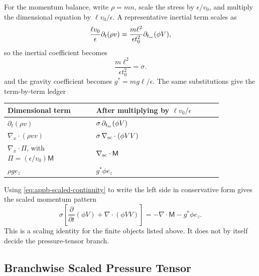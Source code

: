 For the momentum balance, write \(\rho=mn\), scale the stress by
\(\epsilon/v_0\), and multiply the dimensional equation by
\(\ell v_0/\epsilon\).  A representative inertial term scales as
\[
  \frac{\ell v_0}{\epsilon}\partial_t(\rho v)
  =
  \frac{m\ell^2}{\epsilon t_0^2}\partial_{t_{\rm sc}}(\phi V),
\]
so the inertial coefficient becomes
\[
  \frac{m\ell^2}{\epsilon t_0^2}=\sigma.
\]
and the gravity coefficient becomes \(g^*=mg\ell/\epsilon\).  The same
substitutions give the term-by-term ledger
\begin{center}
\begin{tabular}{@{}p{0.35\linewidth}p{0.50\linewidth}@{}}
\toprule
Dimensional term & After multiplying by \(\ell v_0/\epsilon\) \\
\midrule
\(\partial_t(\rho v)\) &
\(\sigma\,\partial_{t_{\rm sc}}(\phi V)\) \\
\(\nabla_x\cdot(\rho vv)\) &
\(\sigma\,\nabla_{\rm sc}\cdot(\phi VV)\) \\
\(\nabla_x\cdot\Pi\), with \(\Pi=(\epsilon/v_0)\mathsf{M}\) &
\(\nabla_{\rm sc}\cdot\mathsf{M}\) \\
\(\rho g e_z\) &
\(g^*\phi e_z\) \\
\bottomrule
\end{tabular}
\end{center}
Using \eqref{eq:appb-scaled-continuity} to write the left side in
conservative form gives the scaled momentum pattern
\begin{equation}
  \sigma\left[
  \frac{\partial}{\partial t}(\phi V)
  +\nabla\cdot(\phi VV)\right]
  =
  -\nabla\cdot\mathsf{M}-g^*\phi e_z.
  \label{eq:appb-scaled-momentum-pattern}
\end{equation}
This is a scaling identity for the finite objects listed above.  It does not
by itself decide the pressure-tensor branch.

\subsection*{Branchwise Scaled Pressure Tensor}

